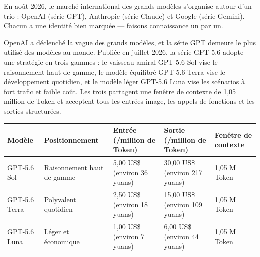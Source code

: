 


En août 2026, le marché international des grands modèles s'organise autour d'un trio : OpenAI (série GPT), Anthropic (série Claude) et Google (série Gemini). Chacun a une identité bien marquée — faisons connaissance un par un.


OpenAI a déclenché la vague des grands modèles, et la série GPT demeure le plus utilisé des modèles au monde. Publiée en juillet 2026, la série GPT-5.6 adopte une stratégie en trois gammes : le vaisseau amiral GPT-5.6 Sol vise le raisonnement haut de gamme, le modèle équilibré GPT-5.6 Terra vise le développement quotidien, et le modèle léger GPT-5.6 Luna vise les scénarios à fort trafic et faible coût. Les trois partagent une fenêtre de contexte de 1,05 million de Token et acceptent tous les entrées image, les appels de fonctions et les sorties structurées.

\begin{center}
\begin{tabularx}{\linewidth}{|X|X|X|X|X|}
\hline
\textbf{Modèle} & \textbf{Positionnement} & \textbf{Entrée (/million de Token)} & \textbf{Sortie (/million de Token)} & \textbf{Fenêtre de contexte} \tabularnewline
\hline
GPT-5.6 Sol & Raisonnement haut de gamme & 5,00 US\$ (environ 36 yuans) & 30,00 US\$ (environ 217 yuans) & 1,05 M Token \tabularnewline
GPT-5.6 Terra & Polyvalent quotidien & 2,50 US\$ (environ 18 yuans) & 15,00 US\$ (environ 109 yuans) & 1,05 M Token \tabularnewline
GPT-5.6 Luna & Léger et économique & 1,00 US\$ (environ 7 yuans) & 6,00 US\$ (environ 44 yuans) & 1,05 M Token \tabularnewline
\hline
\end{tabularx}
\end{center}

